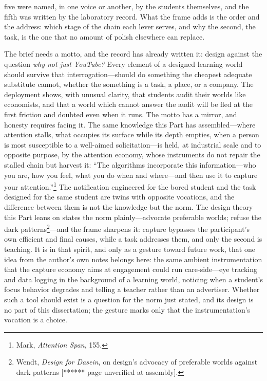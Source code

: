 \documentclass{article}
\begin{document}
five were named, in one voice or another, by the students themselves, and the fifth was written by the laboratory record. What the frame adds is the order and the address: which stage of the chain each lever serves, and why the second, the task, is the one that no amount of polish elsewhere can replace.

The brief needs a motto, and the record has already written it: design against the question \textit{why not just YouTube?} Every element of a designed learning world should survive that interrogation---should do something the cheapest adequate substitute cannot, whether the something is a task, a place, or a company. The deployment shows, with unusual clarity, that students audit their worlds like economists, and that a world which cannot answer the audit will be fled at the first friction and doubted even when it runs. The motto has a mirror, and honesty requires facing it. The same knowledge this Part has assembled---where attention stalls, what occupies its surface while its depth empties, when a person is most susceptible to a well-aimed solicitation---is held, at industrial scale and to opposite purpose, by the attention economy, whose instruments do not repair the stalled chain but harvest it: ``The algorithms incorporate this information---who you are, how you feel, what you do when and where---and then use it to capture your attention.''\footnote{Mark, \textit{Attention Span}, 155.} The notification engineered for the bored student and the task designed for the same student are twins with opposite vocations, and the difference between them is not the knowledge but the norm. The design theory this Part leans on states the norm plainly---advocate preferable worlds; refuse the dark patterns\footnote{Wendt, \textit{Design for Dasein}, on design's advocacy of preferable worlds against dark patterns [****** page unverified at assembly].}---and the frame sharpens it: capture bypasses the participant's own efficient and final causes, while a task addresses them, and only the second is teaching. It is in that spirit, and only as a gesture toward future work, that one idea from the author's own notes belongs here: the same ambient instrumentation that the capture economy aims at engagement could run care-side---eye tracking and data logging in the background of a learning world, noticing when a student's focus behavior degrades and telling a teacher rather than an advertiser. Whether such a tool should exist is a question for the norm just stated, and its design is no part of this dissertation; the gesture marks only that the instrumentation's vocation is a choice.
\end{document}
